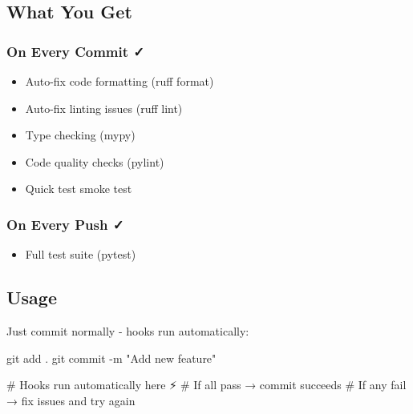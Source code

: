 \subsection{What You Get}\label{cr:app:archive-quickstart-precommit:what-you-get}

\subsubsection{On Every Commit ✓}\label{cr:app:archive-quickstart-precommit:on-every-commit}

\begin{record}

\begin{itemize}
\tightlist
\item
  Auto-fix code formatting (ruff format)
\item
  Auto-fix linting issues (ruff lint)
\item
  Type checking (mypy)
\item
  Code quality checks (pylint)
\item
  Quick test smoke test
\end{itemize}

\end{record}

\subsubsection{On Every Push ✓}\label{cr:app:archive-quickstart-precommit:on-every-push}

\begin{record}

\begin{itemize}
\tightlist
\item
  Full test suite (pytest)
\end{itemize}

\end{record}

\subsection{Usage}\label{cr:app:archive-quickstart-precommit:usage}

\begin{record}

Just commit normally - hooks run automatically:

\begin{textblock}
git add .
git commit -m "Add new feature"

# Hooks run automatically here ⚡
# If all pass → commit succeeds
# If any fail → fix issues and try again
\end{textblock}

\end{record}

